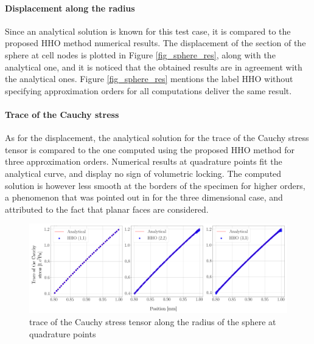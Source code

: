 \paragraph{Displacement along the radius}

Since an analytical solution is known for this test case, it is compared to the proposed HHO method numerical results. The displacement of the section of the sphere at cell nodes
is plotted in Figure \ref{fig_sphere_res}, along with the analytical one, and it is noticed that the obtained results are in agreement with the analytical ones.
Figure \ref{fig_sphere_res} mentions the label HHO without specifying approximation orders for all computations deliver the same result.

\paragraph{Trace of the Cauchy stress}

As for the displacement, the analytical solution for the trace of the Cauchy stress tensor is compared to the one computed using the proposed HHO method for three approximation orders.
Numerical results at quadrature points fit the analytical curve, and display no sign of volumetric locking. The computed solution is however less smooth
at the borders of the specimen for higher orders, a phenomenon that was pointed out in \cite{abbas_hybrid_2019-1} for the three dimensional case, and attributed to the fact that planar faces are considered.

\begin{figure}[H]
    \centering
    \includegraphics[width=15.cm]{../chapter_002_hho_mechanics/drawings/sphere_pressures.png}
    \caption{trace of the Cauchy stress tensor along the radius of the sphere at quadrature points}
    \label{fig_sphere_pressure}
\end{figure}

